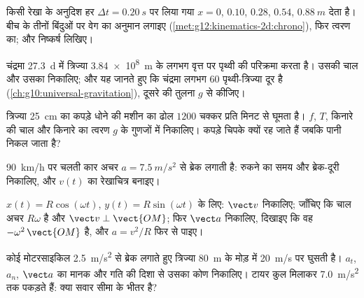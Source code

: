 \begin{exercise}[$\star\star$]\label{exo:g12:kinematics-2d:8}
किसी रेखा के अनुदिश हर $\Delta t = \qty{0.20}{s}$ पर लिया गया  $x = 0$,
$0.10$, $0.28$, $0.54$, $\qty{0.88}{m}$ देता है। बीच के तीनों बिंदुओं पर वेग का
अनुमान लगाइए (\cref{met:g12:kinematics-2d:chrono}), फिर त्वरण का; और निष्कर्ष लिखिए।
\end{exercise}

\begin{exercise}[$\star\star$]\label{exo:g12:kinematics-2d:9}
चंद्रमा \qty{27.3}{d} में त्रिज्या \qty{3.84e8}{m} के लगभग वृत्त पर पृथ्वी की
परिक्रमा करता है। उसकी चाल और उसका 
निकालिए; और यह जानते हुए कि चंद्रमा लगभग $60$ पृथ्वी-त्रिज्या दूर है
(\cref{ch:g10:universal-gravitation}), दूसरे की तुलना $g$ से कीजिए।
\end{exercise}

\begin{exercise}[$\star\star$]\label{exo:g12:kinematics-2d:10}
त्रिज्या \qty{25}{cm} का कपड़े धोने की मशीन का ढोल $1200$ चक्कर प्रति मिनट से
घूमता है। $f$, $T$, किनारे की चाल और किनारे का त्वरण $g$
के गुणजों में निकालिए। कपड़े चिपके क्यों रह जाते हैं जबकि पानी निकल जाता है?
\end{exercise}

\begin{exercise}[$\star\star$]\label{exo:g12:kinematics-2d:11}
\qty{90}{km/h} पर चलती कार अचर $a = \qty{7.5}{m/s^2}$ से ब्रेक लगाती है: रुकने का समय और ब्रेक-दूरी
निकालिए, और $v(t)$ का रेखाचित्र बनाइए।
\end{exercise}

\begin{exercise}[$\star\star\star$]\label{exo:g12:kinematics-2d:12}
$x(t) = R\cos(\omega t)$, $y(t) = R\sin(\omega t)$ के लिए: $\vect v$ निकालिए; जाँचिए कि चाल अचर $R\omega$
है और $\vect v \perp \vect{OM}$; फिर $\vect a$ निकालिए, दिखाइए कि वह $-\omega^2\,\vect{OM}$ है, और $a = v^2/R$ फिर
से पाइए।
\end{exercise}

\begin{exercise}[$\star\star\star$]\label{exo:g12:kinematics-2d:13}
कोई मोटरसाइकिल \qty{2.5}{m/s^2} से ब्रेक लगाते हुए त्रिज्या \qty{80}{m} के मोड़ में
\qty{20}{m/s} पर घुसती है। $a_t$, $a_n$, $\vect a$ का मानक और गति की दिशा से उसका
कोण निकालिए। टायर कुल मिलाकर \qty{7.0}{m/s^2} तक पकड़ते हैं: क्या सवार सीमा के भीतर
है?
\end{exercise}

